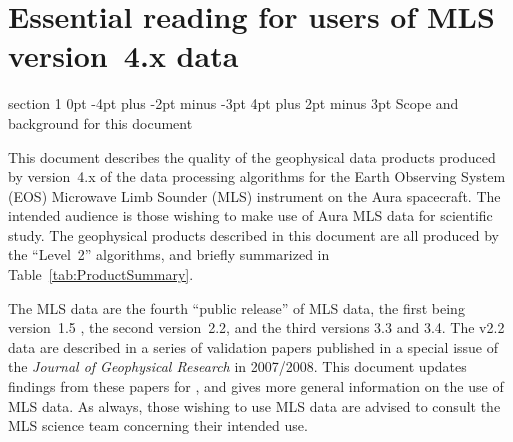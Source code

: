 \documentclass[11pt,draft]{report}
\makeatletter
\renewcommand{\section}{\@startsection%
  {section}%
  {1}%
  {0pt}%
  {-4pt plus -2pt minus -3pt}%
  {4pt plus 2pt minus 3pt}%
  {\Large\sffamily\fontseries{sb}\selectfont\flushleft\color{SectionColor}\figureversion{tabular}}}%
\providecommand{\DIFaddend}{} %
\makeatother
\begin{document}
\DIFaddend %
%
\tableofcontents
%
%
%
\clearpage
%
\renewcommand{\topfraction}{0.9}
\renewcommand{\bottomfraction}{0.9}
\renewcommand{\textfraction}{0.1}
%
\chapter{Essential reading for users of MLS version~4.x data}
\label{chap:Essential}

\section{Scope and background for this document}

This document describes the quality of the geophysical data products
produced by version~4.x of the data processing algorithms for the Earth
Observing System (EOS) Microwave Limb Sounder (MLS) instrument on the
Aura spacecraft.  The intended audience is those wishing to make use of
Aura MLS data for scientific study.  The geophysical products described
in this document are all produced by the ``Level~2'' algorithms, and
briefly summarized in Table~\ref{tab:ProductSummary}.

The \thisv MLS data are the fourth ``public release'' of MLS data, the
first being version~1.5 \citep{EOSMLSV15Quality}, the second
version~2.2, and the third versions 3.3 and 3.4.  The v2.2 data are
described in a series of validation papers published in a special issue
of the \emph{Journal of Geophysical Research} in 2007/2008.  This
document updates findings from these papers for \thisv, and gives more
general information on the use of MLS data.  As always, those wishing to
use MLS data are advised to consult the MLS science team concerning
their intended use.
\end{document}
